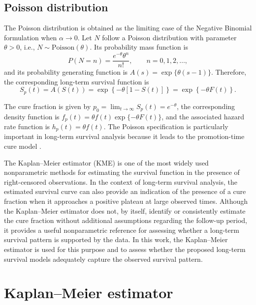 \subsection{Poisson distribution}

The Poisson distribution is obtained as the limiting case of the Negative Binomial
formulation when $\alpha\rightarrow0$. Let $N$ follow a Poisson distribution with
parameter $\theta>0$, i.e., $N\sim\mathrm{Poisson}(\theta)$.
Its probability mass function is
\begin{equation}
\label{eq:poisson_pmf}
P(N=n)
=
\frac{e^{-\theta}\theta^n}{n!},
\qquad n=0,1,2,\ldots,
\end{equation}
and its probability generating function is $A(s) = \exp\{\theta(s-1)\}$. Therefore, the
corresponding long-term survival function is
\begin{equation}
\label{eq:poisson_survival}
S_p(t)
=
A\left(S(t)\right)
=
\exp\left\{-\theta[1-S\left(t\right)]\right\}
=
\exp\left\{-\theta F\left(t\right)\right\}.
\end{equation}

The cure fraction is given by $p_0 = \lim_{t\rightarrow\infty}S_p(t) = e^{-\theta}$,
the corresponding density function is $f_p\left(t\right) = \theta f\left(t\right) \exp\{-\theta F\left(t\right)\}$,
and the associated hazard rate function is $h_p\left(t\right) = \theta f\left(t\right)$. The Poisson specification is particularly important in long-term survival analysis
because it leads to the promotion-time cure model \cite{yakovlev1996stochastic}.

The Kaplan--Meier estimator (KME) is one of the most widely used nonparametric
methods for estimating the survival function in the presence of right-censored
observations. In the context of long-term survival analysis, the estimated survival
curve can also provide an indication of the presence of a cure fraction when it
approaches a positive plateau at large observed times. Although the Kaplan--Meier
estimator does not, by itself, identify or consistently estimate the cure fraction
without additional assumptions regarding the follow-up period, it provides a useful
nonparametric reference for assessing whether a long-term survival pattern is
supported by the data. In this work, the Kaplan--Meier estimator is used for this
purpose and to assess whether the proposed long-term survival models adequately
capture the observed survival pattern.

\section{Kaplan--Meier estimator}


